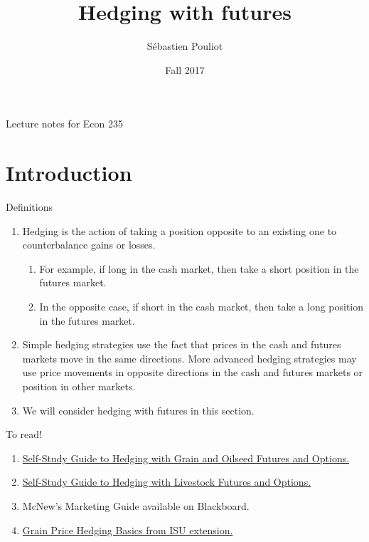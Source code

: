 \documentclass[table,xcolor=pdftex,dvipsnames]{beamer}\usepackage[]{graphicx}\usepackage[]{color}
\title[Hedging with futures]{Hedging with futures}
\author[Pouliot]{S\'{e}bastien Pouliot}
\institute{Iowa State University}
\date{Fall 2017}
\begin{document}

\begin{frame}
\titlepage
\vspace{-0.4in}
\begin{center}
Lecture notes for Econ 235\\
\end{center}
\end{frame}

\section{Introduction}

\begin{frame}{Definitions}
\begin{enumerate}[label=\textbullet]
  \item Hedging is the action of taking a position opposite to an existing one to counterbalance gains or losses.
    \begin{enumerate}[label=-]
         \item For example, if long in the cash market, then take a short position in the futures market.
         \item In the opposite case, if short in the cash market, then take a long position in the futures market.
    \end{enumerate}
  \item Simple hedging strategies use the fact that prices in the cash and futures markets move in the same directions. More advanced hedging strategies may use price movements in opposite directions in the cash and futures markets or position in other markets.
  \item We will consider hedging with futures in this section.
\end{enumerate}
\end{frame}


\begin{frame}{To read!}
\begin{enumerate}[label=\textbullet]
  \item \href{http://www.cmegroup.com/trading/agricultural/self-study-guide-to-hedging-with-grain-and-oilseed-futures-and-options.html}{Self-Study Guide to Hedging with Grain and Oilseed Futures and Options.}
    \item \href{http://www.cmegroup.com/trading/agricultural/self-study-guide-hedging-livestock-futures-options.html}{Self-Study Guide to Hedging with Livestock Futures and Options.}
  \item McNew's Marketing Guide available on Blackboard.
  \item \href{http://www.extension.iastate.edu/agdm/crops/html/a2-60.html}{Grain Price Hedging Basics from ISU extension.}
\end{enumerate}
\end{frame}
\end{document}
